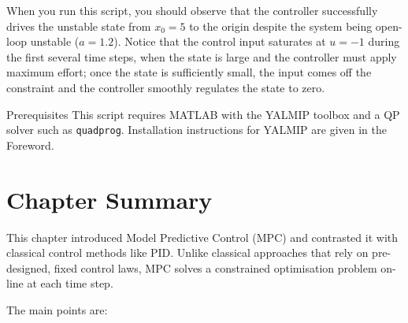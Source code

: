 When you run this script, you should observe that the controller successfully drives the unstable state from $x_0 = 5$ to the origin despite the system being open-loop unstable ($a = 1.2$). Notice that the control input saturates at $u = -1$ during the first several time steps, when the state is large and the controller must apply maximum effort; once the state is sufficiently small, the input comes off the constraint and the controller smoothly regulates the state to zero.

\begin{notebox}{Prerequisites}
	This script requires MATLAB with the YALMIP toolbox and a QP solver such as \texttt{quadprog}. Installation instructions for YALMIP are given in the Foreword.
\end{notebox}


\section{Chapter Summary}

This chapter introduced Model Predictive Control (MPC) and contrasted it with classical control methods like PID. Unlike classical approaches that rely on pre-designed, fixed control laws, MPC solves a constrained optimisation problem on-line at each time step.

The main points are:

